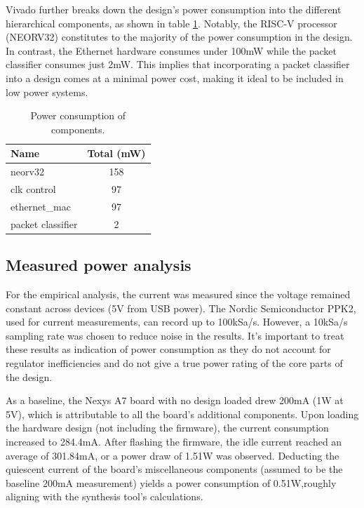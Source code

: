 Vivado further breaks down the design's power consumption into the different hierarchical components, as shown in table \ref{tab:power_consumption}. Notably, the RISC-V processor (NEORV32) constitutes to the majority of the power consumption in the design. In contrast, the Ethernet hardware consumes under 100mW while the packet classifier consumes just 2mW. This implies that incorporating a packet classifier into a design comes at a minimal power cost, making it ideal to be included in low power systems. 


\begin{table}[h]
    \centering
    \caption{Power consumption of components.}
    \begin{tabular}{lc}
        \toprule
        Name & Total (mW) \\
        \midrule
        neorv32 & 158 \\
        clk control & 97 \\
        ethernet\_mac & 97 \\
        packet classifier & 2 \\
        \bottomrule
    \end{tabular}
    \label{tab:power_consumption}
\end{table}



\subsection{Measured power analysis}

For the empirical analysis, the current was measured since the voltage remained constant across devices (5V from USB power). The Nordic Semiconductor PPK2, used for current measurements, can record up to 100kSa/s. However, a 10kSa/s sampling rate was chosen to reduce noise in the results. It's important to treat these results as indication of power consumption as they do not account for regulator inefficiencies and do not give a true power rating of the core parts of the design. 

As a baseline, the Nexys A7 board with no design loaded drew 200mA (1W at 5V), which is attributable to all the board's additional components. Upon loading the hardware design (not including the firmware), the current consumption increased to 284.4mA. After flashing the firmware, the idle current reached an average of 301.84mA, or a power draw of 1.51W was observed. Deducting the quiescent current of the board's miscellaneous components (assumed to be the baseline 200mA measurement) yields a power consumption of 0.51W,roughly aligning with the synthesis tool's calculations.

